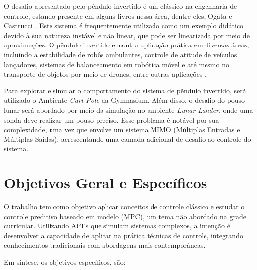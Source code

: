 \documentclass[12pt,           %
a4paper,                       %
openany,                       %
oneside,                       %
chapter=TITLE,                 %
english,                       %
spanish,                       %
brazil,                        %
sumario=tradicional]{abntex2}  %
\begin{document}
\begin{OnehalfSpace}
O desafio apresentado pelo pêndulo invertido é um clássico na engenharia de controle, estando presente em alguns livros nessa área, dentre eles, Ogata \cite{ogata2010engenharia} e Castrucci \cite{castrucci2011controle}. Este sistema é frequentemente utilizado como um exemplo didático devido à sua natureza instável e não linear, que pode ser linearizada por meio de aproximações. O pêndulo invertido encontra aplicação prática em diversas áreas, incluindo a estabilidade de robôs ambulantes, controle de atitude de veículos lançadores, sistemas de balanceamento em robótica móvel e até mesmo no transporte de objetos por meio de drones, entre outras aplicações \cite{kafetzis2017inverted}.

Para explorar e simular o comportamento do sistema de pêndulo invertido, será utilizado o Ambiente \textit{Cart Pole} da Gymnasium. Além disso, o desafio do pouso lunar será abordado por meio da simulação no ambiente \textit{Lunar Lander}, onde uma sonda deve realizar um pouso preciso. Esse problema é notável por sua complexidade, uma vez que envolve um sistema MIMO (Múltiplas Entradas e Múltiplas Saídas), acrescentando uma camada adicional de desafio ao controle do sistema.
	
\section{Objetivos Geral e Específicos}
\label{sec:objetivos}                      %
			
O trabalho tem como objetivo aplicar conceitos de controle clássico e estudar o controle preditivo baseado em modelo (MPC), um tema não abordado na grade curricular. Utilizando API's que simulam sistemas complexos, a intenção é desenvolver a capacidade de aplicar na prática técnicas de controle, integrando conhecimentos tradicionais com abordagens mais contemporâneas. 

Em síntese, os objetivos específicos, são:
			

\end{OnehalfSpace}
\end{document}
